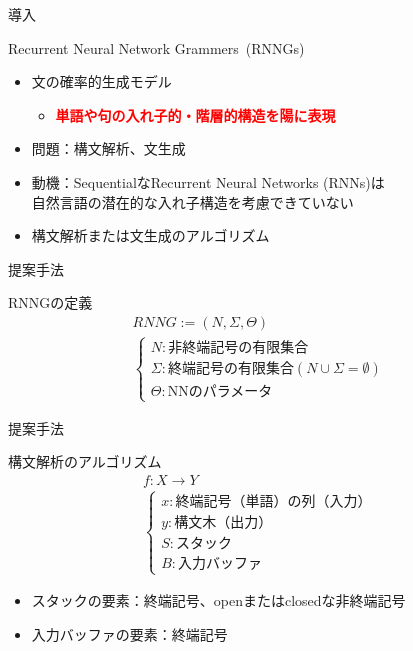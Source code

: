 \documentclass[aspectratio=43,unicode,10pt]{beamer}
\title{\thetitle}
\author[Chris Dyer et al.]
       {Chris Dyer, Adhiguna Kuncoro, Miguel Ballesteros, \\ Noah A. Smith}
\newcommand{\fire}[1]{\textcolor{red}{\textbf{#1}}}
\newcommand{\term}{終端記号}
\newcommand{\nt}{非終端記号}
\newcommand{\thetitle}{Recurrent Neural Network Grammers}
\begin{document}
\begin{frame}
  \titlepage
\end{frame}

\begin{frame}{導入}
  \begin{block}{\thetitle~(RNNGs)}
    \begin{itemize}
      \item 文の確率的生成モデル
        \begin{itemize}
          \item \fire{単語や句の入れ子的・階層的構造を陽に表現}
        \end{itemize}
      \item 問題：構文解析、文生成
      \item 動機：SequentialなRecurrent Neural Networks (RNNs)は \\
            自然言語の潜在的な入れ子構造を考慮できていない
      \item 構文解析または文生成のアルゴリズム
    \end{itemize}
  \end{block}
\end{frame}

\begin{frame}{提案手法}
  \begin{block}{RNNGの定義}
    \begin{gather*}
      RNNG := (N, \Sigma, \Theta) \\
      \begin{cases}
        N: \text{\nt の有限集合} \\
        \Sigma: \text{\term の有限集合} (N \cup \Sigma = \emptyset) \\
        \Theta: \text{NNのパラメータ}
      \end{cases}
    \end{gather*}
  \end{block}
\end{frame}

\begin{frame}{提案手法}
  \begin{block}{構文解析のアルゴリズム}
    \begin{gather*}
      f: X \rightarrow Y \\
      \begin{cases}
        x: \text{\term （単語）の列（入力）} \\
        y: \text{構文木（出力）} \\
        S: \text{スタック} \\
        B: \text{入力バッファ}
      \end{cases}
    \end{gather*}
    \begin{itemize}
      \item スタックの要素：\term、openまたはclosedな\nt
      \item 入力バッファの要素：\term
    \end{itemize}
  \end{block}
\end{frame}
\end{document}
